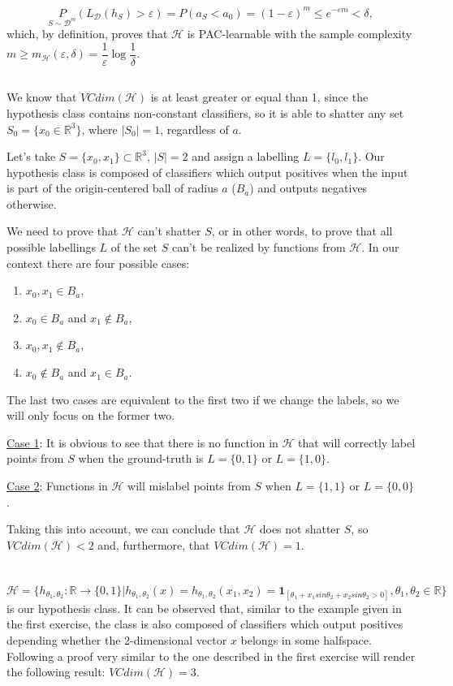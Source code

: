 \documentclass{article}
\begin{document}
$$
\underset{S\sim\mathcal{D}^m}P(L_{\mathcal{D}}(h_S)>\varepsilon) = P(a_S<a_0) = (1-\varepsilon)^m \leq e^{-\varepsilon m} < \delta,
$$
which, by definition, proves that $\mathcal{H}$ is PAC-learnable with the sample complexity $m\geq m_\mathcal{H}(\varepsilon,\delta)=\dfrac{1}{\varepsilon}\log{\dfrac{1}{\delta}}$.
\subsection{}
We know that $VCdim(\mathcal{H})$ is at least greater or equal than 1, since the hypothesis class contains non-constant classifiers, so it is able to shatter any set $S_0=\{x_0\in\mathbb{R}^3\}$, where $|S_0|=1$, regardless of $a$.

Let's take $S=\{x_0, x_1\}\subset\mathbb{R}^3$, $|S|=2$ and assign a labelling $L=\{l_0,l_1\}$. Our hypothesis class is composed of classifiers which output positives when the input is part of the origin-centered ball of radius $a$ ($B_a$) and outputs negatives otherwise.

We need to prove that $\mathcal{H}$ can't shatter $S$, or in other words, to prove that all possible labellings $L$ of the set $S$ can't be realized by functions from $\mathcal{H}$. In our context there are four possible cases: 
\begin{enumerate}
	\item $x_0,x_1\in B_a$,
	\item $x_0\in B_a$ and $x_1\notin B_a$,
	\item $x_0,x_1\notin B_a$,
	\item $x_0\notin B_a$ and $x_1\in B_a$.
\end{enumerate}
The last two cases are equivalent to the first two if we change the labels, so we will only focus on the former two.

\underline{Case 1}: It is obvious to see that there is no function in $\mathcal{H}$ that will correctly label points from $S$ when the ground-truth is $L=\{0,1\}$ or $L=\{1,0\}$.

\underline{Case 2}: Functions in $\mathcal{H}$ will mislabel points from $S$ when $L=\{1,1\}$ or $L=\{0,0\}$.

Taking this into account, we can conclude that $\mathcal{H}$ does not shatter $S$, so $VCdim(\mathcal{H}) < 2$ and, furthermore, that $VCdim(\mathcal{H})=1$. 

\section{}
$\mathcal{H}=\{ h_{\theta_1,\theta_2}:\mathbb{R}\rightarrow\{0,1\}| h_{\theta_1,\theta_2}(x)=h_{\theta_1,\theta_2}(x_1,x_2)=\mathbf{1}_{[\theta_1+x_1sin\theta_2+x_2sin\theta_2>0]}, \theta_1,\theta_2 \in\mathbb{R}\}$ is our hypothesis class. It can be observed that, similar to the example given in the first exercise, the class is also composed of classifiers which output positives depending whether the 2-dimensional vector $x$ belongs in some halfspace. Following a proof very similar to the one described in the first exercise will render the following result: $VCdim(\mathcal{H})=3$.
\end{document}
